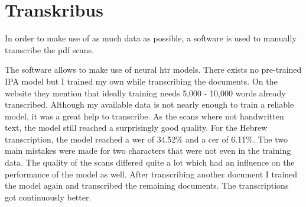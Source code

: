 \section{Transkribus}
In order to make use of as much data as possible, a software is used to manually transcribe the pdf scans.

The software allows to make use of neural \ac{htr} models. There exists no pre-trained IPA model but I trained my own while transcribing the documents. On the website they mention that ideally training needs 5,000 - 10,000 words already transcribed. Although my available data is not nearly enough to train a reliable model, it was a great help to transcribe. As the scans where not handwritten text, the model still reached a surprisingly good quality. For the Hebrew transcription, the model reached a \ac{wer} of 34.52\% and a \ac{cer} of 6.11\%. The two main mistakes were made for two characters that were not even in the training data. The quality of the scans differed quite a lot which had an influence on the performance of the model as well. After transcribing another document I trained the model again and transcribed the remaining documents. The transcriptions got continuously better. 


 	